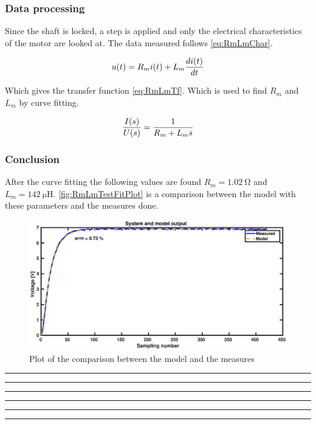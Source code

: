 \subsubsection*{Data processing}

Since the shaft is locked, a step is applied and only the electrical characteristics of the motor are looked at. The data measured follows \autoref{eq:RmLmChar}.

\begin{equation} \label{eq:RmLmChar}
	u(t)=R_m i(t)+L_m \frac{d i(t)}{d t} \addunit{\volt}
\end{equation}

Which gives the transfer function \autoref{eq:RmLmTf}. Which is used to find $R_m$ and $L_m$ by curve fitting.

\begin{equation} \label{eq:RmLmTf}
\frac{I(s)}{U(s)}=\frac{1}{R_m +L_m s} \addunit{1}
\end{equation}

\subsubsection*{Conclusion}

After the curve fitting the following values are found $R_m=\SI{1.02}{\ohm}$ and $L_m=\SI{142}{\micro\henry}$. \autoref{fig:RmLmTestFitPlot} is a comparison between the model with these parameters and the measures done.

\begin{figure}[htbp]
	\centering
	\includegraphics[width=\textwidth]{figures/appendix/Motor&GearTests/RmLmFitPlot}
	\caption{Plot of the comparison between the model and the measures}\label{fig:RmLmTestFitPlot}
\end{figure}
\hrule

\hrule

\hrule

\hrule

\hrule

\hrule
